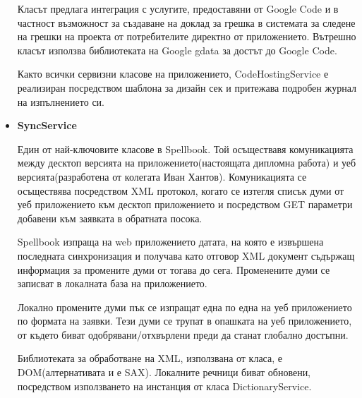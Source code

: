 \begin{itemize}
    Класът предлага интеграция с услугите, предоставяни от Google Code
    и в частност възможност за създаване на доклад за грешка в
    системата за следене на грешки на проекта от потребителите
    директно от приложението. Вътрешно класът използва библиотеката на
    Google gdata за достът до Google Code.

    Както всички сервизни класове на приложението, CodeHostingService е
    реализиран посредством шаблона за дизайн сек и притежава подробен
    журнал на изпълнението си.

  \item \textbf{SyncService}

    Един от най-ключовите класове в Spellbook. Той осъществавя
    комуникацията между десктоп версията на приложението(настоящата
    дипломна работа) и уеб версията(разработена от колегата Иван
    Хантов). Комуникацията се осъществява посредством XML протокол,
    когато се изтегля списък думи от уеб приложението към десктоп
    приложението и посредством GET параметри добавени към заявката в
    обратната посока. 

    Spellbook изпраща на web приложението датата, на която е извършена
    последната синхронизация и получава като отговор XML документ
    съдържащ информация за промените думи от тогава до
    сега. Променените думи се записват в локалната база на
    приложението.

    Локално промените думи пък се изпращат една по една на уеб
    приложението по формата на заявки. Тези думи се трупат в опашката
    на уеб приложението, от където биват одобрявани/отхвърлени преди
    да станат глобално достъпни. 

    Библиотеката за обработване на XML, използвана от класа, е
    DOM(алтернативата и е SAX). Локалните речници биват обновени,
    посредством използването на инстанция от класа DictionaryService. 
\end{itemize}
 
